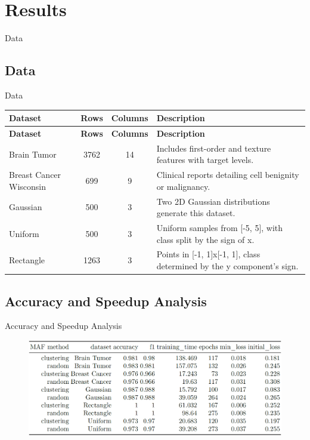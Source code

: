 \documentclass[aspectratio=169]{beamer}
\begin{document}
\section{Results}


\begin{frame}
    \begin{center}
        \Huge Data
    \end{center}
\end{frame}

\subsection{{Data}}
\begin{frame}{Data}
{\rm
\begin{longtable}{|>{\raggedright\arraybackslash}p{3cm}|c|c|>{\raggedright\arraybackslash}p{5cm}|}
\hline
\textbf{Dataset} & \textbf{Rows} & \textbf{Columns} & \textbf{Description} \\ \hline
\endfirsthead
\hline
\textbf{Dataset} & \textbf{Rows} & \textbf{Columns} & \textbf{Description} \\ \hline
\endhead
Brain Tumor & 3762 & 14 & Includes first-order and texture features with target levels. \\ \hline
Breast Cancer Wisconsin & 699 & 9 & Clinical reports detailing cell benignity or malignancy. \\ \hline
Gaussian & 500 & 3 & Two 2D Gaussian distributions generate this dataset. \\ \hline
Uniform & 500 & 3 & Uniform samples from [-5, 5], with class split by the sign of x. \\ \hline
Rectangle & 1263 & 3 & Points in [-1, 1]x[-1, 1], class determined by the y component's sign. \\ \hline
\end{longtable}
    }
\end{frame}

\subsection{Accuracy and Speedup Analysis}
\begin{frame}{Accuracy and Speedup Analysis}
\begin{figure}
    \centering
    \includegraphics[width=0.95\linewidth]{../../fig/acc_speedup_table.png}
    \label{fig:acc_speedup_table}
\end{figure}
\end{frame}
\end{document}
